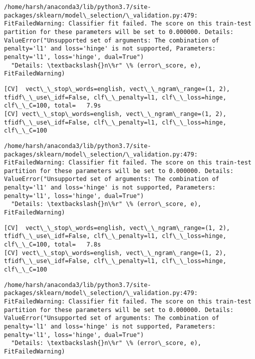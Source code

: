 \documentclass[11pt]{article}
\begin{document}
    \begin{Verbatim}[commandchars=\\\{\}]
/home/harsh/anaconda3/lib/python3.7/site-packages/sklearn/model\_selection/\_validation.py:479: FitFailedWarning: Classifier fit failed. The score on this train-test partition for these parameters will be set to 0.000000. Details: 
ValueError("Unsupported set of arguments: The combination of penalty='l1' and loss='hinge' is not supported, Parameters: penalty='l1', loss='hinge', dual=True")
  "Details: \textbackslash{}n\%r" \% (error\_score, e), FitFailedWarning)

    \end{Verbatim}

    \begin{Verbatim}[commandchars=\\\{\}]
[CV]  vect\_\_stop\_words=english, vect\_\_ngram\_range=(1, 2), tfidf\_\_use\_idf=False, clf\_\_penalty=l1, clf\_\_loss=hinge, clf\_\_C=100, total=   7.9s
[CV] vect\_\_stop\_words=english, vect\_\_ngram\_range=(1, 2), tfidf\_\_use\_idf=False, clf\_\_penalty=l1, clf\_\_loss=hinge, clf\_\_C=100 

    \end{Verbatim}

    \begin{Verbatim}[commandchars=\\\{\}]
/home/harsh/anaconda3/lib/python3.7/site-packages/sklearn/model\_selection/\_validation.py:479: FitFailedWarning: Classifier fit failed. The score on this train-test partition for these parameters will be set to 0.000000. Details: 
ValueError("Unsupported set of arguments: The combination of penalty='l1' and loss='hinge' is not supported, Parameters: penalty='l1', loss='hinge', dual=True")
  "Details: \textbackslash{}n\%r" \% (error\_score, e), FitFailedWarning)

    \end{Verbatim}

    \begin{Verbatim}[commandchars=\\\{\}]
[CV]  vect\_\_stop\_words=english, vect\_\_ngram\_range=(1, 2), tfidf\_\_use\_idf=False, clf\_\_penalty=l1, clf\_\_loss=hinge, clf\_\_C=100, total=   7.8s
[CV] vect\_\_stop\_words=english, vect\_\_ngram\_range=(1, 2), tfidf\_\_use\_idf=False, clf\_\_penalty=l1, clf\_\_loss=hinge, clf\_\_C=100 

    \end{Verbatim}

    \begin{Verbatim}[commandchars=\\\{\}]
/home/harsh/anaconda3/lib/python3.7/site-packages/sklearn/model\_selection/\_validation.py:479: FitFailedWarning: Classifier fit failed. The score on this train-test partition for these parameters will be set to 0.000000. Details: 
ValueError("Unsupported set of arguments: The combination of penalty='l1' and loss='hinge' is not supported, Parameters: penalty='l1', loss='hinge', dual=True")
  "Details: \textbackslash{}n\%r" \% (error\_score, e), FitFailedWarning)

    \end{Verbatim}
\end{document}
